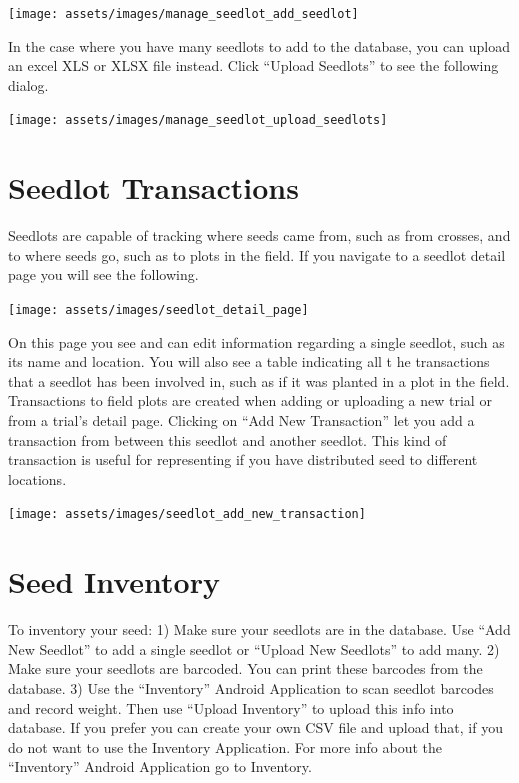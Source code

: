 \documentclass[
  12pt,
]{book}
\begin{document}
\begin{center}\texttt{[image: assets/images/manage\_seedlot\_add\_seedlot]} \end{center}

In the case where you have many seedlots to add to the database, you can upload an excel XLS or XLSX file instead. Click ``Upload Seedlots'' to see the following dialog.

\begin{center}\texttt{[image: assets/images/manage\_seedlot\_upload\_seedlots]} \end{center}

\hypertarget{seedlot-transactions}{%
\section{Seedlot Transactions}\label{seedlot-transactions}}

Seedlots are capable of tracking where seeds came from, such as from crosses, and to where seeds go, such as to plots in the field. If you navigate to a seedlot detail page you will see the following.

\begin{center}\texttt{[image: assets/images/seedlot\_detail\_page]} \end{center}

On this page you see and can edit information regarding a single seedlot, such as its name and location. You will also see a table indicating all t he transactions that a seedlot has been involved in, such as if it was planted in a plot in the field. Transactions to field plots are created when adding or uploading a new trial or from a trial's detail page. Clicking on ``Add New Transaction'' let you add a transaction from between this seedlot and another seedlot. This kind of transaction is useful for representing if you have distributed seed to different locations.

\begin{center}\texttt{[image: assets/images/seedlot\_add\_new\_transaction]} \end{center}

\hypertarget{seed-inventory}{%
\section{Seed Inventory}\label{seed-inventory}}

To inventory your seed: 1) Make sure your seedlots are in the database. Use ``Add New Seedlot'' to add a single seedlot or ``Upload New Seedlots'' to add many. 2) Make sure your seedlots are barcoded. You can print these barcodes from the database. 3) Use the ``Inventory'' Android Application to scan seedlot barcodes and record weight. Then use ``Upload Inventory'' to upload this info into database. If you prefer you can create your own CSV file and upload that, if you do not want to use the Inventory Application. For more info about the ``Inventory'' Android Application go to Inventory.
\end{document}
